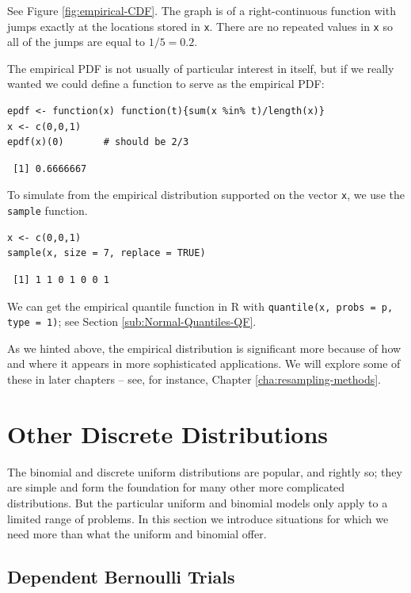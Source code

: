 \documentclass[captions=tableheading]{scrbook}
\begin{document}
See Figure \ref{fig:empirical-CDF}. The graph is of a right-continuous function with jumps exactly at the locations stored in \texttt{x}. There are no repeated values in \texttt{x} so all of the jumps are equal to \(1/5=0.2\).

The empirical PDF is not usually of particular interest in itself, but if we really wanted we could define a function to serve as the empirical PDF:


\begin{verbatim}
epdf <- function(x) function(t){sum(x %in% t)/length(x)}
x <- c(0,0,1)
epdf(x)(0)       # should be 2/3
\end{verbatim}

\begin{verbatim}
 [1] 0.6666667
\end{verbatim}

To simulate from the empirical distribution supported on the vector \texttt{x}, we use the \texttt{sample} function.


\begin{verbatim}
x <- c(0,0,1)
sample(x, size = 7, replace = TRUE)
\end{verbatim}

\begin{verbatim}
 [1] 1 1 0 1 0 0 1
\end{verbatim}

We can get the empirical quantile function in \textsf{R} with \texttt{quantile(x, probs = p, type = 1)}; see Section \ref{sub:Normal-Quantiles-QF}.

As we hinted above, the empirical distribution is significant more because of how and where it appears in more sophisticated applications. We will explore some of these in later chapters -- see, for instance, Chapter \ref{cha:resampling-methods}.
\section{Other Discrete Distributions}
\label{sec-1-6}

\label{sec:other-discrete-distributions}

The binomial and discrete uniform distributions are popular, and rightly so; they are simple and form the foundation for many other more complicated distributions. But the particular uniform and binomial models only apply to a limited range of problems. In this section we introduce situations for which we need more than what the uniform and binomial offer.
\subsection{Dependent Bernoulli Trials}
\label{sec-1-6-1}
\end{document}
